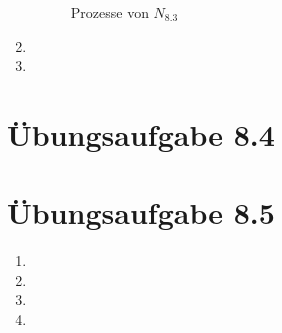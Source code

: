 \documentclass[a4paper]{scrartcl}
\begin{document}
\begin{enumerate}
\begin{figure}[h]
            \caption{Prozesse von $N_{8.3}$}
            \label{fig:prozesse}
        \end{figure}

    \item

    \item

\end{enumerate}

\section*{Übungsaufgabe 8.4} 

\section*{Übungsaufgabe 8.5} 
\begin{enumerate}
    \item

    \item

    \item

    \item

\end{enumerate}
\end{document}
